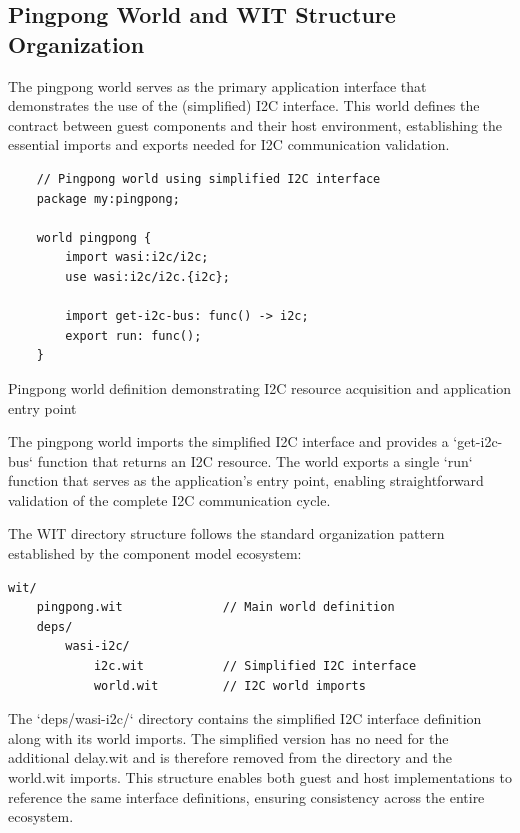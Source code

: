 \subsection{Pingpong World and WIT Structure Organization}

The pingpong world serves as the primary application interface that demonstrates the use of the (simplified) I2C interface. This world defines the contract between guest components and their host environment, establishing the essential imports and exports needed for I2C communication validation.

\begin{listing}[H]
    \begin{verbatim}
    // Pingpong world using simplified I2C interface
    package my:pingpong;
    
    world pingpong {
        import wasi:i2c/i2c;
        use wasi:i2c/i2c.{i2c};
    
        import get-i2c-bus: func() -> i2c;
        export run: func();
    }
    \end{verbatim}
    \caption{Pingpong world definition demonstrating I2C resource acquisition and application entry point}
    \label{lst:pingpong-world}
\end{listing}

The pingpong world imports the simplified I2C interface and provides a `get-i2c-bus` function that returns an I2C resource. The world exports a single `run` function that serves as the application's entry point, enabling straightforward validation of the complete I2C communication cycle.

The WIT directory structure follows the standard organization pattern established by the component model ecosystem:

\begin{verbatim}
wit/
    pingpong.wit              // Main world definition
    deps/
        wasi-i2c/
            i2c.wit           // Simplified I2C interface
            world.wit         // I2C world imports
\end{verbatim}

The `deps/wasi-i2c/` directory contains the simplified I2C interface definition along with its world imports. The simplified version has no need for the additional delay.wit and is therefore removed from the directory and the world.wit imports. This structure enables both guest and host implementations to reference the same interface definitions, ensuring consistency across the entire ecosystem.

